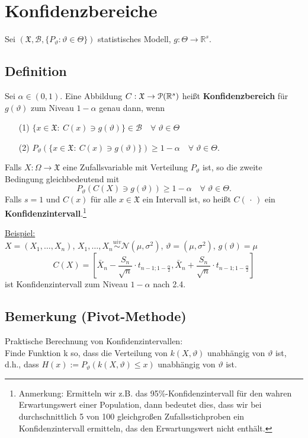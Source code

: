 \documentclass[a4paper,11pt,twoside,titlepage]{article}
\newcommand{\R}{{\mathbb R}}
\newcommand{\XX}{{\mathfrak X}} %
\newcommand\PM{ \EuScript{P} } %
\newcommand\BB{ \mathcal{B} } %
\newcommand\NN{ \mathcal{N} } %
\newcommand{\uiv}{\ensuremath{\stackrel{uiv}{\sim}}}
\begin{document}
\cleardoublepage
\section{Konfidenzbereiche}
Sei $(\XX,\BB,\{P_\vartheta:\vartheta\in\Theta\})$ statistisches Modell,
$g:\Theta\rightarrow\R^s$.

\subsection{Definition}
Sei $\alpha\in (0,1).$ Eine Abbildung $C:\XX\rightarrow \PM(\R^s)$ heißt \textbf{Konfidenzbereich}
für $g(\vartheta)$ zum Niveau $1-\alpha$ genau dann, wenn
\begin{itemize}
  \item[(1)] $\{x\in\XX:~ C(x)\ni g(\vartheta)\}\in \BB \quad \forall \; \vartheta\in\Theta$
  \item[(2)] $P_\vartheta \left( \{x\in\XX:~ C(x)\ni g(\vartheta)\}\right) \geq 1-\alpha\quad
     \forall \; \vartheta\in\Theta.$
\end{itemize}
Falls $X:\Omega\rightarrow\XX$ eine Zufallsvariable mit Verteilung $P_\vartheta$ ist,
so die zweite Bedingung gleichbedeutend mit
$$P_\vartheta \left( C(X)\ni g(\vartheta) \right) \geq 1-\alpha\quad \forall \; \vartheta\in\Theta.$$
Falls $s=1$ und $C(x)$ f\"ur alle $x\in\XX$ ein Intervall ist, so heißt
$C(\, \cdot \,)$ ein \textbf{Konfidenzintervall}.\footnote{Anmerkung: Ermitteln wir z.B. das 95\%-Konfidenzintervall für den wahren Erwartungswert einer Population, dann bedeutet dies, dass wir bei durchschnittlich 5 von 100 gleichgroßen Zufallsstichproben ein Konfidenzintervall ermitteln, das den Erwartungswert nicht enthält.}

\underline{Beispiel:}\\
$X=(X_1,\ldots,X_n)$, $X_1,\ldots,X_n\uiv\NN(\mu,\sigma^2)$, $\vartheta=(\mu,\sigma^2)$, $g(\vartheta)=\mu$
\[C(X)=[\bar X_n-\frac{S_n}{\sqrt n}\cdot t_{n-1;1-\frac\alpha2}, \bar X_n+\frac{S_n}{\sqrt{n}}\cdot t_{n-1;1-\frac\alpha2}]\]
ist Konfidenzintervall zum Niveau $1-\alpha$ nach 2.4.

\subsection{Bemerkung (Pivot-Methode)}
Praktische Berechnung von Konfidenzintervallen:\\
Finde Funktion k so, dass die Verteilung von $k(X,\vartheta)$ unabhängig von $\vartheta$ ist, d.h., dass $H(x):=P_\vartheta(k(X,\vartheta)\leq x)$ unabhängig von $\vartheta$ ist.
\end{document}
